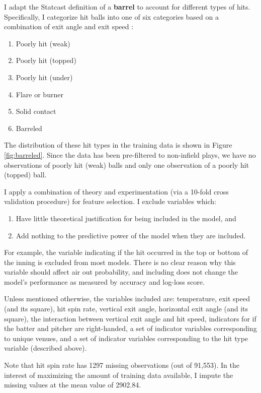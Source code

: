 I adapt the Statcast definition of a \textbf{barrel} to account for different types of hits. Specifically, I categorize hit balls into one of six categories based on a combination of exit angle and exit speed \cite{metzelaar}:

\begin{enumerate}
  \item Poorly hit (weak)
  \item Poorly hit (topped)
  \item Poorly hit (under)
  \item Flare or burner
  \item Solid contact
  \item Barreled
\end{enumerate}

The distribution of these hit types in the training data is shown in Figure \ref{fig:barreled}. Since the data has been pre-filtered to non-infield plays, we have no observations of poorly hit (weak) balls and only one observation of a poorly hit (topped) ball.

I apply a combination of theory and experimentation (via a 10-fold cross validation procedure) for feature selection. I exclude variables which:
\begin{enumerate}
  \item Have little theoretical justification for being included in the model, and
  \item Add nothing to the predictive power of the model when they are included.
\end{enumerate}
For example, the variable indicating if the hit occurred in the top or bottom of the inning is excluded from most models. There is no clear reason why this variable should affect air out probability, and including does not change the model's performance as measured by accuracy and log-loss score.

Unless mentioned otherwise, the variables included are: temperature, exit speed (and its square), hit spin rate, vertical exit angle, horizontal exit angle (and its square), the interaction between vertical exit angle and hit speed, indicators for if the batter and pitcher are right-handed, a set of indicator variables corresponding to unique venues, and a set of indicator variables corresponding to the hit type variable (described above).

Note that hit spin rate has 1297 missing observations (out of 91,553). In the interest of maximizing the amount of training data available, I impute the missing values at the mean value of 2902.84.


